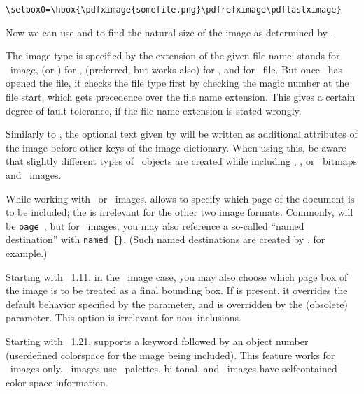 \documentclass{pdftexmanual}
\begin{document}
\begin{verbatim}
\setbox0=\hbox{\pdfximage{somefile.png}\pdfrefximage\pdflastximage}
\end{verbatim}
Now we can use  and  to find the natural size of the
image as determined by \PDFTEX.

The image type is specified by the extension of the given file name:
 stands for \PNG\ image,  (or ) for
\JPEG,  (preferred, but  works also) for
\JBIGTWO, and  for \PDF\ file. But once \PDFTEX\ has opened
the file, it checks the file type first by checking the magic number at
the file start, which gets precedence over the file name extension. This
gives a certain degree of fault tolerance, if the file name extension is
stated wrongly.

Similarly to , the optional text given by  will be written as additional attributes of the image before other
keys of the image dictionary. When using this, be aware that slightly
different types of \PDF\ objects are created while including \PNG,
\JPEG, or \ bitmaps and \PDF\ images.

While working with \PDF\ or \ images,  allows
to specify which page of the document is to be included; the
 is irrelevant for the other two image formats.
Commonly,  will be {\tt page }, but for \PDF\ images, you may also reference a so-called
``named destination'' with {\tt named \{\}}.
(Such named destinations are created by , for example.)

Starting with \PDFTEX\ 1.11, in the \PDF\ image case, you may also
choose which page box of the image is to be treated as a final bounding
box. If  is present, it overrides the default
behavior specified by the  parameter, and is overridden
by the (obsolete)  parameter. This option is
irrelevant for non\hyph \PDF\ inclusions.

Starting with \PDFTEX\ 1.21,  supports a 
keyword followed by an object number (user\hyph defined colorspace for
the image being included). This feature works for \JPEG\ images only.
\PNG\ images use \RGB\ palettes,  bi-tonal, and \PDF\ images have
self\hyph contained color space information.

\subsection{}
\end{document}
